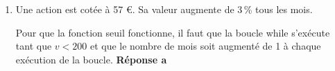 \begin{enumerate}
En $1$, $f'(x)$ s'annule en changeant de signe et en passant du positif au négatif, la fonction $f$ va donc admettre un maximum en 1.
\hfill\textbf{Réponse c}

\item Une action est cotée à 57 \euro. Sa valeur augmente de 3\,\% tous les mois.

Pour que la fonction seuil fonctionne, il faut que la boucle while s'exécute tant que $v<200$ et que le nombre de mois soit augmenté de 1 à chaque exécution de la boucle. \hfill \textbf{Réponse a}



\end{enumerate}

\vspace{1cm}
